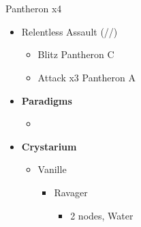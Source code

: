 \chapter[Chapter 4]{}

\renewcommand{\first}{[1] Relentless Assault (\com/\rav/\rav)}

\begin{battle}{Pantheron x4}
\begin{itemize}
    \item \first
    \begin{itemize}
        \item Blitz Pantheron C
        \item Attack x3 Pantheron A
    \end{itemize}
\end{itemize}
\end{battle}


\begin{menu}
\begin{multicols}{2}
\begin{itemize}
    \item \textbf{Paradigms}
    \begin{itemize}
        \item {}%
{\paradigmline{\rav}{\rav}{}}%
{\paradigmline{\syn}{\sab}{}}%
{\paradigmline{\rav}{\med}{}}%
{\paradigmline[4]{\textit{\rav}}{\textit{[\sab]}}{}}%
{\paradigmline{[\rav]}{\rav}{}}
    \end{itemize}
    \columnbreak
    \item \textbf{Crystarium}
    \begin{itemize}
        \item Vanille
        \begin{itemize}
            \item Ravager
            \begin{itemize}
                \item 2 nodes, Water
            \end{itemize}
        \end{itemize}
    \end{itemize}
\end{itemize}
\end{multicols}
\end{menu}

\renewcommand{\first}{[1] Dualcasting (\rav/\rav)}
\renewcommand{\second}{[2] Tide Turner (\syn/\sab)}
\renewcommand{\third}{[3] Yin \& Yang (\rav/\med)}
\renewcommand{\fourth}{[4] Undermine (\rav/\sab)}
\renewcommand{\fifth}{[5] Dualcasting (\rav/\rav)}


